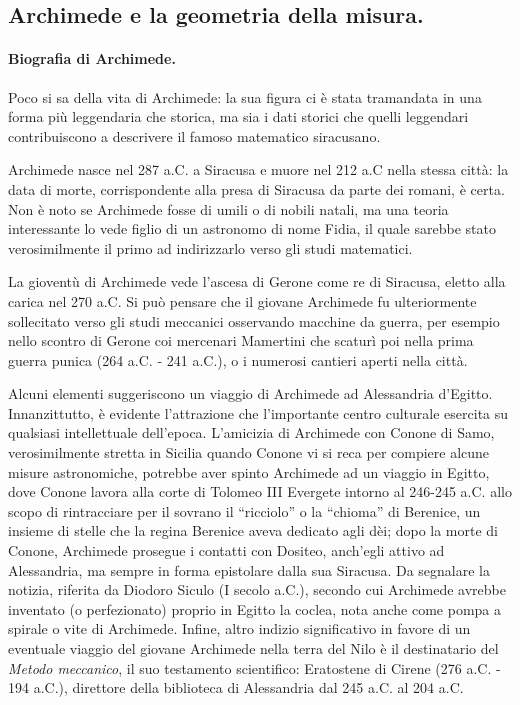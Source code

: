 \subsection{Archimede e la geometria della misura.}\label{ArchimedeELaGeometriaDiMisura}
\paragraph{Biografia di Archimede.} Poco si sa della vita di Archimede: la sua figura ci \`e stata tramandata in una forma pi\`u leggendaria che storica, ma sia i dati storici che quelli leggendari contribuiscono a descrivere il famoso matematico siracusano.
\par Archimede nasce nel 287 a.C. a Siracusa e muore nel 212 a.C nella stessa citt\`a: la data di morte, corrispondente alla presa di Siracusa da parte dei romani, \`e certa. Non \`e noto se Archimede fosse di umili o di nobili natali, ma una teoria interessante lo vede figlio di un astronomo di nome Fidia, il quale sarebbe stato verosimilmente il primo ad indirizzarlo verso gli studi matematici.
\par La giovent\`u di Archimede vede l'ascesa di Gerone come re di Siracusa, eletto alla carica nel 270 a.C. Si pu\`o pensare che il giovane Archimede fu ulteriormente sollecitato verso gli studi meccanici osservando macchine da guerra, per esempio nello scontro di Gerone coi mercenari Mamertini che scatur\`i poi nella prima guerra punica (264 a.C. - 241 a.C.), o i numerosi cantieri aperti nella citt\`a.
\par Alcuni elementi suggeriscono un viaggio di Archimede ad Alessandria d'Egitto. Innanzittutto, \`e evidente l'attrazione che l'importante centro culturale esercita su qualsiasi intellettuale dell'epoca. L'amicizia di Archimede con Conone di Samo, verosimilmente stretta in Sicilia quando Conone vi si reca per compiere alcune misure astronomiche, potrebbe aver spinto Archimede ad un viaggio in Egitto, dove Conone lavora alla corte di Tolomeo III Evergete intorno al 246-245 a.C. allo scopo di rintracciare per il sovrano il ``ricciolo'' o la ``chioma'' di Berenice, un insieme di stelle che la regina Berenice aveva dedicato agli d\`ei; dopo la morte di Conone, Archimede prosegue i contatti con Dositeo, anch'egli attivo ad Alessandria, ma sempre in forma epistolare dalla sua Siracusa. Da segnalare la notizia, riferita da Diodoro Siculo (I secolo a.C.), secondo cui Archimede avrebbe inventato (o perfezionato) proprio in Egitto la coclea, nota anche come pompa a spirale o vite di Archimede. Infine, altro indizio significativo in favore di un eventuale viaggio del giovane Archimede nella terra del Nilo \`e il destinatario del \textit{Metodo meccanico}, il suo testamento scientifico: Eratostene di Cirene (276 a.C. - 194 a.C.), direttore della biblioteca di Alessandria dal 245 a.C. al 204 a.C.
